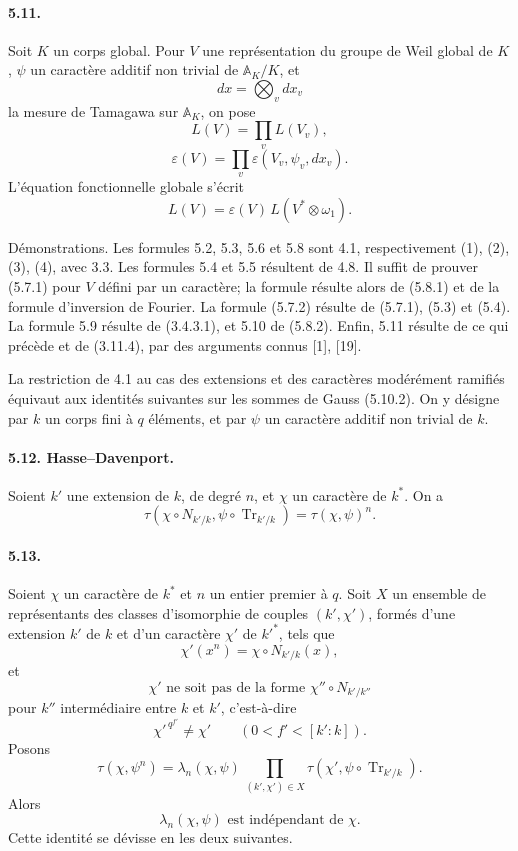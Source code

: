 \documentclass[10pt]{article}
\newcommand{\Tr}{\operatorname{Tr}}
\providecommand{\Tr}{\operatorname{Tr}}
\providecommand{\Tr}{\operatorname{Tr}}
\providecommand{\Tr}{\operatorname{Tr}}
\begin{document}
\paragraph{5.11.} Soit \(K\) un corps global. Pour \(V\) une représentation du groupe de Weil global de \(K\), \(\psi\) un caractère additif non trivial de \(\mathbb A_K/K\), et
\[
dx=\bigotimes_v dx_v
\]
la mesure de Tamagawa sur \(\mathbb A_K\), on pose
\[
\tag{5.11.1}
L(V)=\prod_v L(V_v),
\]
\[
\tag{5.11.2}
\varepsilon(V)=\prod_v\varepsilon(V_v,\psi_v,dx_v).
\]
L'équation fonctionnelle globale s'écrit
\[
\tag{5.11.3}
L(V)=\varepsilon(V)\,L(V^*\otimes\omega_1).
\]

Démonstrations. Les formules 5.2, 5.3, 5.6 et 5.8 sont 4.1, respectivement (1), (2), (3), (4), avec 3.3. Les formules 5.4 et 5.5 résultent de 4.8. Il suffit de prouver (5.7.1) pour \(V\) défini par un caractère; la formule résulte alors de (5.8.1) et de la formule d'inversion de Fourier. La formule (5.7.2) résulte de (5.7.1), (5.3) et (5.4). La formule 5.9 résulte de (3.4.3.1), et 5.10 de (5.8.2). Enfin, 5.11 résulte de ce qui précède et de (3.11.4), par des arguments connus [1], [19].

La restriction de 4.1 au cas des extensions et des caractères modérément ramifiés équivaut aux identités suivantes sur les sommes de Gauss (5.10.2). On y désigne par \(k\) un corps fini à \(q\) éléments, et par \(\psi\) un caractère additif non trivial de \(k\).

\paragraph{5.12. Hasse--Davenport.} Soient \(k'\) une extension de \(k\), de degré \(n\), et \(\chi\) un caractère de \(k^*\). On a
\[
\tag{5.12.1}
\tau(\chi\circ N_{k'/k},\psi\circ\Tr_{k'/k})
=
\tau(\chi,\psi)^n.
\]

\paragraph{5.13.} Soient \(\chi\) un caractère de \(k^*\) et \(n\) un entier premier à \(q\). Soit \(X\) un ensemble de représentants des classes d'isomorphie de couples \((k',\chi')\), formés d'une extension \(k'\) de \(k\) et d'un caractère \(\chi'\) de \(k'^*\), tels que
\[
\tag{a}
\chi'(x^n)=\chi\circ N_{k'/k}(x),
\]
et
\[
\tag{b}
\chi'\text{ ne soit pas de la forme }\chi''\circ N_{k'/k''}
\]
pour \(k''\) intermédiaire entre \(k\) et \(k'\), c'est-à-dire
\[
\chi'^{\,q^{f'}}\ne\chi'
\qquad(0<f'<[k':k]).
\]
Posons
\[
\tau(\chi,\psi^n)=
\lambda_n(\chi,\psi)\,
\prod_{(k',\chi')\in X}
\tau(\chi',\psi\circ\Tr_{k'/k}).
\]
Alors
\[
\tag{5.13.1}
\lambda_n(\chi,\psi)\text{ est indépendant de }\chi.
\]
Cette identité se dévisse en les deux suivantes.
\end{document}
